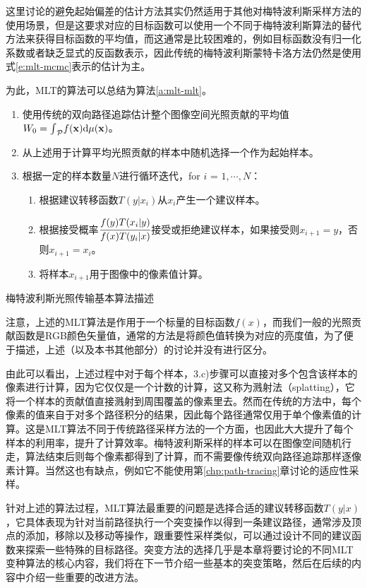 这里讨论的避免起始偏差的估计方法其实仍然适用于其他对梅特波利斯采样方法的使用场景，但是这要求对应的目标函数可以使用一个不同于梅特波利斯算法的替代方法来获得目标函数的平均值，而这通常是比较困难的，例如目标函数没有归一化系数或者缺乏显式的反函数表示，因此传统的梅特波利斯蒙特卡洛方法仍然是使用式\ref{e:mlt-mcmc}表示的估计为主。

为此，MLT的算法可以总结为算法\ref{a:mlt-mlt}。

\begin{algorithm}
\begin{enumerate}
	\item 使用传统的双向路径追踪估计整个图像空间光照贡献的平均值$W_0={\rm \int}_{\mathcal{P}}f({\mathbf{x}}){\rm d}\mu({\mathbf{x}})$。
	\item 从上述用于计算平均光照贡献的样本中随机选择一个作为起始样本。
	\item 根据一定的样本数量$N$进行循环迭代，for $i$ = $1,\cdots,N$：
	\begin{enumerate}
		\item 根据建议转移函数$T({y}|{x}_i)$从${x}_i$产生一个建议样本。
		\item 根据接受概率$ \cfrac{f({y})T({x}_i|{y})}{f({x})T({y}_i|{x})}$接受或拒绝建议样本，如果接受则${x}_{i+1}={y}$，否则${x}_{i+1}={x}_i$。
		\item 将样本${x}_{i+1}$用于图像中的像素值计算。
	\end{enumerate}
\end{enumerate}
\caption{梅特波利斯光照传输基本算法描述}
\label{a:mlt-mlt}
\end{algorithm}

注意，上述的MLT算法是作用于一个标量的目标函数$f({x})$，而我们一般的光照贡献函数是RGB颜色矢量值，通常的方法是将颜色值转换为对应的亮度值，为了便于描述，上述（以及本书其他部分）的讨论并没有进行区分。

由此可以看出，上述过程中对于每个样本，3.c)步骤可以直接对多个包含该样本的像素进行计算，因为它仅仅是一个计数的计算，这又称为溅射法（splatting），它将一个样本的贡献值直接溅射到周围覆盖的像素里去。然而在传统的方法中，每个像素的值来自于对多个路径积分的结果，因此每个路径通常仅用于单个像素值的计算。这是MLT算法不同于传统路径采样方法的一个方面，也因此大大提升了每个样本的利用率，提升了计算效率。梅特波利斯采样的样本可以在图像空间随机行走，算法结束后则每个像素都得到了计算，而不需要像传统双向路径追踪那样逐像素计算。当然这也有缺点，例如它不能使用第\ref{chp:path-tracing}章讨论的适应性采样。

针对上述的算法过程，MLT算法最重要的问题是选择合适的建议转移函数$T({y}|{x})$，它具体表现为针对当前路径执行一个突变操作以得到一条建议路径，通常涉及顶点的添加，移除以及移动等操作，跟重要性采样类似，可以通过设计不同的建议函数来探索一些特殊的目标路径。突变方法的选择几乎是本章将要讨论的不同MLT变种算法的核心内容，我们将在下一节介绍一些基本的突变策略，然后在后续的内容中介绍一些重要的改进方法。



